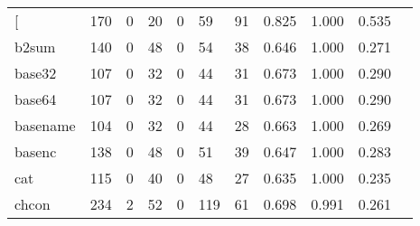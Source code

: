 \begin{longtable}{lp{1.10cm}p{1.10cm}p{1.10cm}p{1.10cm}p{1.10cm}p{1.10cm}p{1.10cm}p{1.10cm}p{1.10cm}p{1.10cm}}
\bottomrule
\endlastfoot
{[}         &                    170 &                                  0 &                                20 &                                0 &                                59 &                              91 &                          0.825 &                                 1.000 &                               0.535 \\
b2sum     &                    140 &                                  0 &                                48 &                                0 &                                54 &                              38 &                          0.646 &                                 1.000 &                               0.271 \\
base32    &                    107 &                                  0 &                                32 &                                0 &                                44 &                              31 &                          0.673 &                                 1.000 &                               0.290 \\
base64    &                    107 &                                  0 &                                32 &                                0 &                                44 &                              31 &                          0.673 &                                 1.000 &                               0.290 \\
basename  &                    104 &                                  0 &                                32 &                                0 &                                44 &                              28 &                          0.663 &                                 1.000 &                               0.269 \\
basenc    &                    138 &                                  0 &                                48 &                                0 &                                51 &                              39 &                          0.647 &                                 1.000 &                               0.283 \\
cat       &                    115 &                                  0 &                                40 &                                0 &                                48 &                              27 &                          0.635 &                                 1.000 &                               0.235 \\
chcon     &                    234 &                                  2 &                                52 &                                0 &                               119 &                              61 &                          0.698 &                                 0.991 &                               0.261 \\

\end{longtable}
